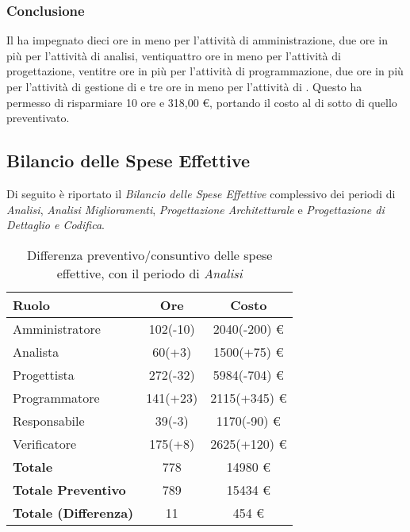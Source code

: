 \subsubsection{Conclusione}
Il  ha impegnato dieci ore in meno per l'attivit\`a di amministrazione, due ore in pi\`u per l'attivit\`a di analisi, ventiquattro ore in meno per l'attivit\`a di progettazione, ventitre ore in pi\`u per l'attivit\`a di programmazione, due ore in pi\`u per l'attivit\`a di gestione di  e tre ore in meno per l'attivit\`a di . Questo ha permesso di risparmiare 10 ore e 318,00 \euro{}, portando il costo  al di sotto di quello preventivato.


\subsection{Bilancio delle Spese Effettive}
Di seguito \`e riportato il \textit{Bilancio delle Spese Effettive} complessivo dei periodi di \textit{Analisi}, \textit{Analisi Miglioramenti}, \textit{Progettazione Architetturale} e \textit{Progettazione di Dettaglio e Codifica}.

\begin{table}[H]
	\centering
	\begin{tabular}{ l c c }
		\textbf{Ruolo} & \textbf{Ore} & \textbf{Costo} \\
		\hline
		Amministratore & 102(-10) & 2040(-200) \euro{} \\
		Analista & 60(+3) & 1500(+75) \euro{} \\
		Progettista & 272(-32) & 5984(-704) \euro{} \\
		Programmatore & 141(+23) & 2115(+345) \euro{} \\
		Responsabile & 39(-3) & 1170(-90) \euro{} \\
		Verificatore & 175(+8) & 2625(+120) \euro{} \\
		\hline
		\textbf{Totale \glossaryItem{Consuntivo}} & 778 & 14980 \euro{} \\
		\hline
		\textbf{Totale Preventivo} & 789 & 15434 \euro{} \\
		\hline
		\textbf{Totale (Differenza)} & 11 & 454 \euro{} \\
		\hline
	\end{tabular}
	\caption{Differenza preventivo/consuntivo delle spese effettive, con il periodo di \textit{Analisi}}
\end{table}


